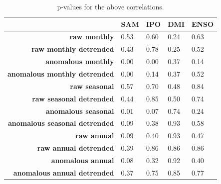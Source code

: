 \begin{table}[H]
\begin{tabular}{@{}rllll@{}}
\toprule
                                      & \textbf{SAM} & \textbf{IPO} & \textbf{DMI} & \textbf{ENSO} \\ \midrule
\textbf{raw monthly}                  & 0.53     & 0.60     & 0.24     & 0.63      \\
\textbf{raw monthly detrended}        & 0.43     & 0.78     & 0.25     & 0.52      \\
\textbf{anomalous monthly}            & 0.00     & 0.00     & 0.37     & 0.14      \\
\textbf{anomalous monthly detrended}  & 0.00     & 0.14     & 0.37     & 0.52      \\
\textbf{raw seasonal}                 & 0.57     & 0.70     & 0.48     & 0.84      \\
\textbf{raw seasonal detrended}       & 0.44     & 0.85     & 0.50     & 0.74      \\
\textbf{anomalous seasonal}           & 0.01     & 0.07     & 0.74     & 0.24      \\
\textbf{anomalous seasonal detrended} & 0.09     & 0.38     & 0.93     & 0.58      \\
\textbf{raw annual}                   & 0.09     & 0.40     & 0.93     & 0.47      \\
\textbf{raw annual detrended}         & 0.39     & 0.86     & 0.86     & 0.86      \\
\textbf{anomalous annual}             & 0.08     & 0.32     & 0.92     & 0.40      \\
\textbf{anomalous annual detrended}   & 0.37     & 0.75     & 0.85     & 0.77      \\ \bottomrule
\end{tabular}
\caption{p-values for the above correlations.}
\end{table}

